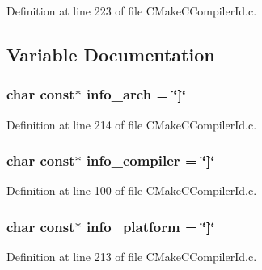\-Definition at line 223 of file \-C\-Make\-C\-Compiler\-Id.\-c.



\subsection{\-Variable \-Documentation}
\subsubsection[{info\-\_\-arch}]{\setlength{\rightskip}{0pt plus 5cm}char const$\ast$ {\bf info\-\_\-arch} = \char`\"{}]\char`\"{}}\label{CMakeCCompilerId_8c_a59647e99d304ed33b15cb284c27ed391}


\-Definition at line 214 of file \-C\-Make\-C\-Compiler\-Id.\-c.

\subsubsection[{info\-\_\-compiler}]{\setlength{\rightskip}{0pt plus 5cm}char const$\ast$ {\bf info\-\_\-compiler} = \char`\"{}]\char`\"{}}\label{CMakeCCompilerId_8c_a4b0efeb7a5d59313986b3a0390f050f6}


\-Definition at line 100 of file \-C\-Make\-C\-Compiler\-Id.\-c.

\subsubsection[{info\-\_\-platform}]{\setlength{\rightskip}{0pt plus 5cm}char const$\ast$ {\bf info\-\_\-platform} = \char`\"{}]\char`\"{}}\label{CMakeCCompilerId_8c_a2321403dee54ee23f0c2fa849c60f7d4}


\-Definition at line 213 of file \-C\-Make\-C\-Compiler\-Id.\-c.

